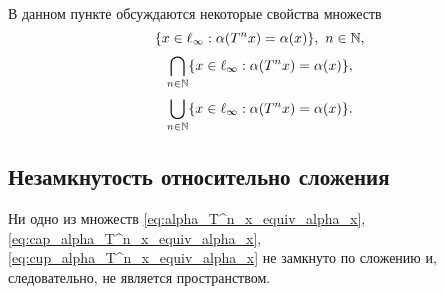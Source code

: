 В данном пункте обсуждаются некоторые свойства множеств
\begin{equation}
	\label{eq:alpha_T^n_x_equiv_alpha_x}
	\{x \in \ell_\infty : \alpha(T^n x) = \alpha(x) \}, ~n\in\N,
\end{equation}
\begin{equation}
	\label{eq:cap_alpha_T^n_x_equiv_alpha_x}
	\bigcap\limits_{n\in\N}\{x \in \ell_\infty : \alpha(T^n x) = \alpha(x) \}
	,
\end{equation}
\begin{equation}
	\label{eq:cup_alpha_T^n_x_equiv_alpha_x}
	\bigcup_{n\in\N}\{x \in \ell_\infty : \alpha(T^n x) = \alpha(x) \}
	.
\end{equation}

\subsection{Незамкнутость относительно сложения}

\begin{theorem}
	Ни одно из множеств
	\eqref{eq:alpha_T^n_x_equiv_alpha_x}, \eqref{eq:cap_alpha_T^n_x_equiv_alpha_x}, \eqref{eq:cup_alpha_T^n_x_equiv_alpha_x}
	не замкнуто по сложению и, следовательно, не является пространством.
\end{theorem}


